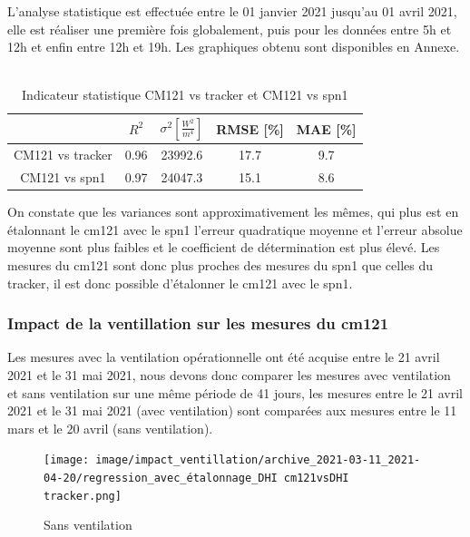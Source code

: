\documentclass[12pt,a4paper]{article}
\begin{document}
\begin{flushleft}
L'analyse statistique est effectuée entre le 01 janvier 2021 jusqu'au 01 avril 2021, elle est réaliser une première fois globalement, puis pour les données entre 5h et 12h et enfin entre 12h et 19h. Les graphiques obtenu sont disponibles en Annexe.
~\\



\begin{table}[H]
\begin{center}
\begin{tabular}{ |c|c|c|c|c| } 
 \hline
  & $R^2$ & $\sigma ^2 [\frac{W^2}{m^4}]$ & RMSE [\%] & MAE [\%] \\ 
  \hline
 CM121 vs tracker & 0.96 & 23992.6 & 17.7 & 9.7\\ 
 \hline
 CM121 vs spn1 & 0.97 & 24047.3 & 15.1 & 8.6 \\ 
 \hline
\end{tabular}
\caption{Indicateur statistique CM121 vs tracker et CM121 vs spn1}
\end{center}
\end{table}


On constate que les variances sont approximativement les mêmes, qui plus est en étalonnant le cm121 avec le spn1 l'erreur quadratique moyenne et l'erreur absolue moyenne sont plus faibles et le coefficient de détermination est plus élevé. Les mesures du cm121 sont donc plus proches des mesures du spn1 que celles du tracker, il est donc possible d'étalonner le cm121 avec le spn1.  \\



\subsubsection{Impact de la ventillation sur les mesures du cm121}

Les mesures avec la ventilation opérationnelle ont été acquise entre le 21 avril 2021 et le 31 mai 2021, nous devons donc comparer les mesures avec ventilation et sans ventilation sur une même période de 41 jours, les mesures entre le 21 avril 2021 et le 31 mai 2021 (avec ventilation) sont comparées aux mesures entre le 11 mars et le 20 avril (sans ventilation).

\begin{figure}[H]
\centering
\texttt{[image: image/impact\_ventillation/archive\_2021-03-11\_2021-04-20/regression\_avec\_étalonnage\_DHI cm121vsDHI tracker.png]}  
\caption{Sans ventilation}  
\end{figure}


\end{flushleft}
\end{document}
